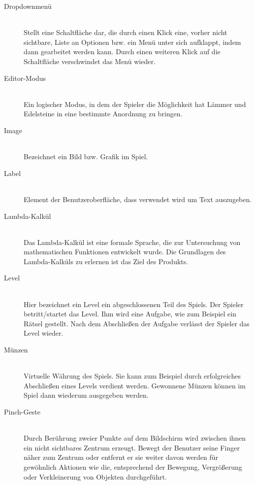 \begin{description}
	\item[Dropdownmenü] \hfill \\
	Stellt eine Schaltfläche dar, die durch einen Klick eine, vorher nicht sichtbare, Liste an Optionen bzw.
	ein Menü unter sich aufklappt, indem dann gearbeitet werden kann. 
	Durch einen weiteren Klick auf die Schaltfläche verschwindet das Menü wieder.
	
	\item[Editor-Modus] \hfill \\
	Ein logischer Modus, in dem der Spieler die Möglichkeit hat Lämmer und Edelsteine in eine bestimmte Anordnung zu bringen.
	
	\item[Image] \hfill \\
	Bezeichnet ein Bild bzw. Grafik im Spiel.
	
	\item[Label] \hfill \\
	Element der Benutzeroberfläche, dass verwendet wird um Text auszugeben. 
	
	\item[Lambda-Kalkül] \hfill \\
	Das Lambda-Kalkül ist eine formale Sprache, die zur Untersuchung von mathematischen Funktionen entwickelt wurde.
	Die Grundlagen des Lambda-Kalküls zu erlernen ist das Ziel des Produkts.
	
	\item[Level] \hfill \\
	Hier bezeichnet ein Level ein abgeschlossenen Teil des Spiels. Der Spieler betritt/startet das Level. Ihm wird eine Aufgabe,
	wie zum Beispiel ein Rätsel gestellt. Nach dem Abschließen der Aufgabe verlässt der Spieler das Level wieder.
	
	\item[Münzen] \hfill \\
	Virtuelle Währung des Spiels. Sie kann zum Beispiel durch erfolgreiches Abschließen eines Levels verdient werden.
	Gewonnene Münzen können im Spiel dann wiederum ausgegeben werden.
	
	\item[Pinch-Geste] \hfill \\
	Durch Berührung zweier Punkte auf dem Bildschirm wird zwischen ihnen ein nicht sichtbares Zentrum erzeugt.
	Bewegt der Benutzer seine Finger näher zum Zentrum oder entfernt er sie weiter davon werden für gewöhnlich
	Aktionen wie die, entsprechend der Bewegung, Vergrößerung oder Verkleinerung von Objekten durchgeführt.
	

\end{description}
